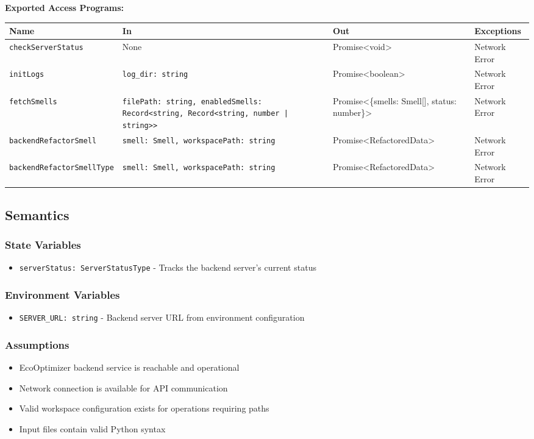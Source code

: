 \documentclass[12pt, titlepage]{article}
\begin{document}
\noindent \textbf{Exported Access Programs:}\\
\begin{tabularx}{\linewidth}{|>{\raggedright\arraybackslash}X|>{\raggedright\arraybackslash}X|>{\raggedright\arraybackslash}X|>{\raggedright\arraybackslash}X|}
    \hline
    \textbf{Name} & \textbf{In} & \textbf{Out} & \textbf{Exceptions} \\ 
    \hline
    \texttt{checkServerStatus} & None & Promise<void> & Network Error \\
    \hline
    \texttt{initLogs} & \texttt{log\_dir: string} & Promise<boolean> & Network Error \\
    \hline
    \texttt{fetchSmells} & \texttt{filePath: string, enabledSmells: Record<string, Record<string, number | string>>} & 
    Promise<\{smells: Smell[], status: number\}> & Network Error \\
    \hline
    \texttt{backendRefactor\allowbreak Smell} & \texttt{smell: Smell, workspacePath: string} & Promise<RefactoredData> & Network Error \\
    \hline
    \texttt{backendRefactor\allowbreak SmellType} & \texttt{smell: Smell, workspacePath: string} & Promise<RefactoredData> & Network Error \\
    \hline
\end{tabularx}

\subsection{Semantics}

\subsubsection{State Variables}
\begin{itemize}
    \item \texttt{serverStatus: ServerStatusType} - Tracks the backend server's current status
\end{itemize}

\subsubsection{Environment Variables}
\begin{itemize}
    \item \texttt{SERVER\_URL: string} - Backend server URL from environment configuration
\end{itemize}

\subsubsection{Assumptions}
\begin{itemize}
    \item EcoOptimizer backend service is reachable and operational
    \item Network connection is available for API communication
    \item Valid workspace configuration exists for operations requiring paths
    \item Input files contain valid Python syntax
\end{itemize}
\end{document}
